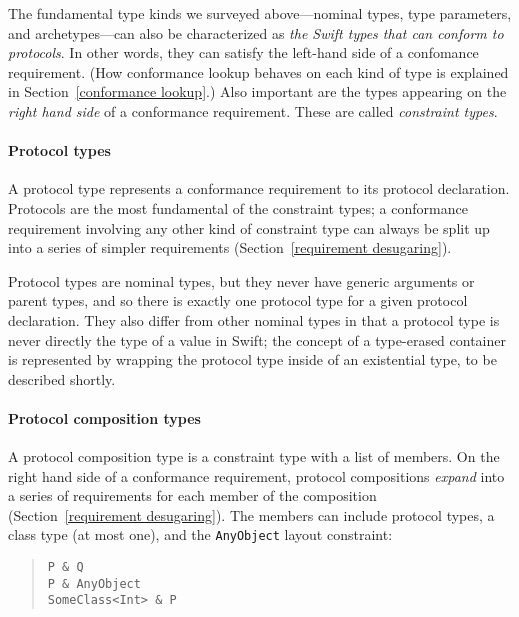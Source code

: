 \documentclass[../generics]{subfiles}
\begin{document}
The fundamental type kinds we surveyed above---nominal types, type parameters, and archetypes---can also be characterized as  \emph{the Swift types that can conform to protocols}. In other words, they can satisfy the left-hand side of a confomance requirement. (How conformance lookup behaves on each kind of type is explained in Section~\ref{conformance lookup}.) Also important are the types appearing on the \emph{right hand side} of a conformance requirement. These are called \emph{constraint types}.

\paragraph{Protocol types}
A protocol type represents a conformance requirement to its protocol declaration. Protocols are the most fundamental of the constraint types; a conformance requirement involving any other kind of constraint type can always be split up into a series of simpler requirements (Section~\ref{requirement desugaring}).

Protocol types are nominal types, but they never have generic arguments or parent types, and so there is exactly one protocol type for a given protocol declaration. They also differ from other nominal types in that a protocol type is never directly the type of a value in Swift; the concept of a type-erased container is represented by wrapping the protocol type inside of an existential type, to be described shortly.

\paragraph{Protocol composition types}
A protocol composition type is a constraint type with a list of members. On the right hand side of a conformance requirement, protocol compositions \emph{expand} into a series of requirements for each member of the composition (Section~\ref{requirement desugaring}). The members can include protocol types, a class type (at most one), and the \texttt{AnyObject} layout constraint:
\begin{quote}
\begin{verbatim}
P & Q
P & AnyObject
SomeClass<Int> & P
\end{verbatim}
\end{quote}
\end{document}
